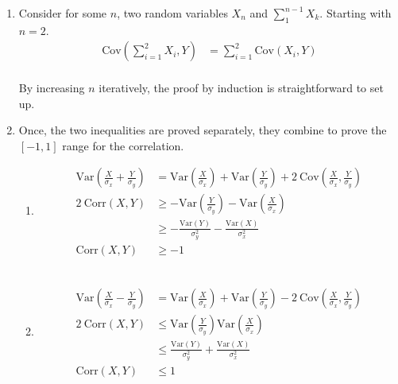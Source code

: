 \begin{enumerate}
	
	\item Consider for some $ n $, two random variables $ X_n $ and $ \sum_{1}^{n-1} X_k$. Starting with $ n = 2 $. \\
	
	\begin{align}
		\mathrm{Cov}\left(\sum\limits_{i = 1}^{2}X_i, Y\right) &= \sum\limits_{i = 1}^{2} \mathrm{Cov}(X_i, Y) 
	\end{align} \\
	
	By increasing $ n $ iteratively, the proof by induction is straightforward to set up. \\
	
	\item Once, the two inequalities are proved separately, they combine to prove the $ [-1, 1] $ range for the correlation.\\
	
		\begin{enumerate}
			
			\item \begin{align}
				\mathrm{Var}\left(\frac{X}{\sigma_x} + \frac{Y}{\sigma_y}\right) &=\mathrm{Var}\left(\frac{X}{\sigma_x}\right) +  \mathrm{Var}\left(\frac{Y}{\sigma_y}\right) + 2\ \mathrm{Cov}\left(\frac{X}{\sigma_x}, \frac{Y}{\sigma_y}\right)  \nonumber \\
				2\ \mathrm{Corr}(X, Y) &\geq - \mathrm{Var}\left(\frac{Y}{\sigma_y}\right) - \mathrm{Var}\left(\frac{X}{\sigma_x}\right) \\
				&\geq - \frac{\mathrm{Var}(Y)}{\sigma_y^2} - \frac{\mathrm{Var}(X)}{\sigma_x^2} \\
				\mathrm{Corr}(X, Y) &\geq - 1 
			\end{align} \\
			
			\item \begin{align}
				\mathrm{Var}\left(\frac{X}{\sigma_x} - \frac{Y}{\sigma_y}\right) &=\mathrm{Var}\left(\frac{X}{\sigma_x}\right) +  \mathrm{Var}\left(\frac{Y}{\sigma_y}\right) - 2\ \mathrm{Cov}\left(\frac{X}{\sigma_x}, \frac{Y}{\sigma_y}\right)  \nonumber \\
				2\ \mathrm{Corr}(X, Y) &\leq  \mathrm{Var}\left(\frac{Y}{\sigma_y}\right)  \mathrm{Var}\left(\frac{X}{\sigma_x}\right) \\
				&\leq  \frac{\mathrm{Var}(Y)}{\sigma_y^2} + \frac{\mathrm{Var}(X)}{\sigma_x^2} \\
				\mathrm{Corr}(X, Y) &\leq  1 
			\end{align} \\
		\end{enumerate}
	

\end{enumerate}
